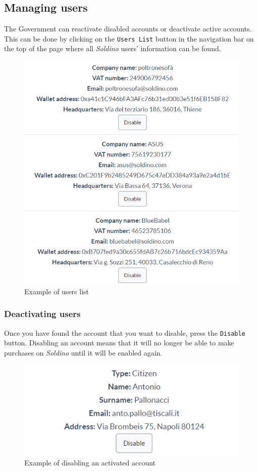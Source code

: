 	\subsection{Managing users}
	The Government can reactivate disabled accounts or deactivate active accounts.
	This can be done by clicking on the \texttt{Users List} button in the navigation
	bar on the top of the page where all \textit{Soldino} users' information can be found.
	\begin{figure}[H]
		\includegraphics[width=13cm]{res/images/users_list.png}
		\centering
		\caption{Example of users list}
	\end{figure}
		\subsubsection{Deactivating users}
		Once you have found the account that you want to disable, press the 
		\texttt{Disable} button. Disabling an account means that it will no longer be able to make purchases on \textit{Soldino} 
		until it will be enabled again.
		\begin{figure}[H]
			\includegraphics[width=13cm]{res/images/users_disable.png}
			\centering
			\caption{Example of disabling an activated account}
		\end{figure}
